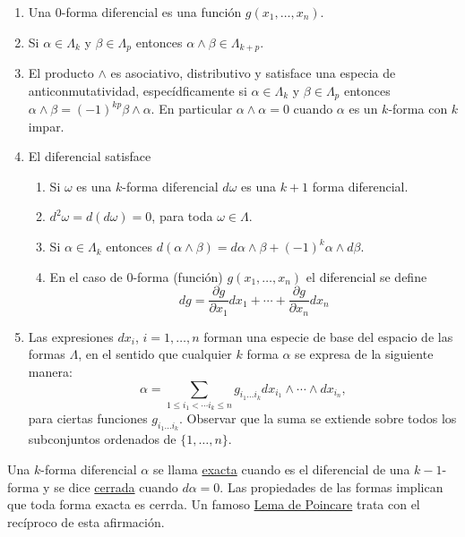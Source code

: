 \begin{enumerate}
   \item Una 0-forma diferencial es una función $g(x_1,\ldots,x_n)$.

  \item Si $\alpha\in\Lambda_k$ y $\beta\in\Lambda_p$ entonces $\alpha \wedge \beta\in \Lambda_{k+p}$.
  \item El producto $\wedge$ es asociativo, distributivo y satisface una especia de anticonmutatividad, especídficamente si $\alpha\in\Lambda_k$ y $\beta\in\Lambda_p$ entonces $\alpha\wedge \beta=(-1)^{kp}\beta\wedge\alpha$. En particular $\alpha\wedge\alpha=0$ cuando $\alpha$ es un $k$-forma con $k$ impar.
  \item El diferencial satisface
  \begin{enumerate}
    \item Si $\omega$ es una $k$-forma diferencial $d\omega$ es una $k+1$ forma diferencial.
    \item  $d^2\omega=d(d\omega)=0$, para toda $\omega\in\Lambda$.
    \item Si $\alpha\in\Lambda_k$ entonces  $d(\alpha\wedge\beta)=d\alpha\wedge\beta+(-1)^k\alpha\wedge d\beta$.
    \item En el caso de $0$-forma (función) $g(x_1,\ldots,x_n)$ el diferencial se define
    \[dg=\frac{\partial g}{\partial x_1}dx_1+\cdots+\frac{\partial g}{\partial x_n}dx_n\]

  \end{enumerate}
  \item Las expresiones $dx_i$, $i=1,\ldots,n$ forman una especie de base del espacio de las formas $\Lambda$, en el sentido que cualquier $k$ forma $\alpha$ se expresa de la siguiente manera:
  \[\alpha=\sum_{1\leq i_1<\cdots i_k\leq n}g_{i_1\ldots i_k} dx_{i_1}\wedge\cdots\wedge dx_{i_n},\]
  para ciertas funciones $g_{i_1\ldots i_k}$. Observar que la suma se extiende sobre todos los subconjuntos ordenados de $\{1,\ldots,n\}$.
\end{enumerate}


Una $k$-forma diferencial $\alpha$ se llama \href{https://es.wikipedia.org/wiki/Formas_diferenciales_cerradas_y_exactas}{exacta} cuando es el diferencial de una $k-1$-forma y se dice \href{https://es.wikipedia.org/wiki/Formas_diferenciales_cerradas_y_exactas}{cerrada} cuando $d\alpha=0$. Las propiedades de las formas implican que toda forma exacta es cerrda. Un famoso \href{https://es.wikipedia.org/wiki/Formas_diferenciales_cerradas_y_exactas#Lema_de_Poincar.C3.A9}{Lema de Poincare} trata con el recíproco de esta afirmación.

